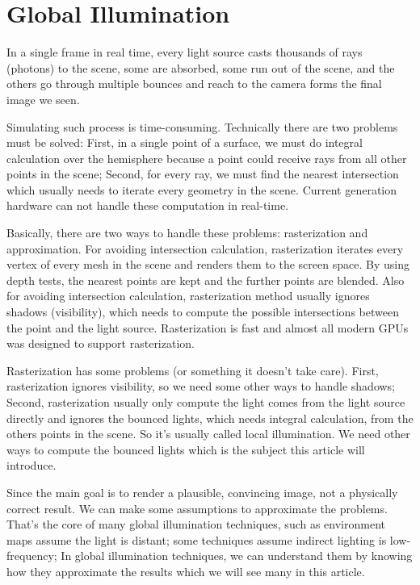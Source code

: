 \part{Global Illumination}
In a single frame in real time, every light source casts thousands of rays (photons) to the scene, some are absorbed, some run out of the scene, and the others go through multiple bounces and reach to the camera forms the final image we seen.

Simulating such process is time-consuming. Technically there are two problems must be solved: First, in a single point of a surface, we must do integral calculation over the hemisphere because a point could receive rays from all other points in the scene; Second, for every ray, we must find the nearest intersection which usually needs to iterate every geometry in the scene. Current generation hardware can not handle these computation in real-time. 

Basically, there are two ways to handle these problems: rasterization and approximation. For avoiding intersection calculation, rasterization iterates every vertex of every mesh in the scene and renders them to the screen space. By using depth tests, the nearest points are kept and the further points are blended. Also for avoiding intersection calculation, rasterization method usually ignores shadows (visibility), which needs to compute the possible intersections between the point and the light source. Rasterization is fast and almost all modern GPUs was designed to support rasterization. 

Rasterization has some problems (or something it doesn't take care). First, rasterization ignores visibility, so we need some other ways to handle shadows; Second, rasterization usually only compute the light comes from the light source directly and ignores the bounced lights, which needs integral calculation, from the others points in the scene. So it's usually called local illumination. We need other ways to compute the bounced lights which is the subject this article will introduce.

Since the main goal is to render a plausible, convincing image, not a physically correct result. We can make some assumptions to approximate the problems. That's the core of many global illumination techniques, such as environment maps assume the light is distant; some techniques assume indirect lighting is low-frequency; In global illumination techniques, we can understand them by knowing how they approximate the results which we will see many in this article.

